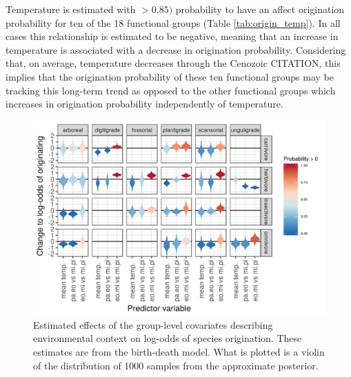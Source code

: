 \documentclass[12pt,letterpaper]{article}
\begin{document}
Temperature is estimated with \(> 0.85)\) probability to have an affect origination probability for ten of the 18 functional groups (Table \ref{tab:origin_temp}). In all cases this relationship is estimated to be negative, meaning that an increase in temperature is associated with a decrease in origination probability. Considering that, on average, temperature decreases through the Cenozoic CITATION, this implies that the origination probability of these ten functional groups may be tracking this long-term trend as opposed to the other functional groups which increases in origination probability independently of temperature.
\begin{figure}[ht]
  \centering
  \includegraphics[width=\textwidth,height=0.4\textheight,keepaspectratio=true]{figure/group_on_origin_bd}
  \caption[Effects of group-level covariates on log-odds of ecotype origination as estimated from the birth-death model]{Estimated effects of the group-level covariates describing environmental context on log-odds of species origination. These estimates are from the birth-death model. What is plotted is a violin of the distribution of 1000 samples from the approximate posterior.} 
  \label{fig:group_origin_bd}
\end{figure}
\end{document}
